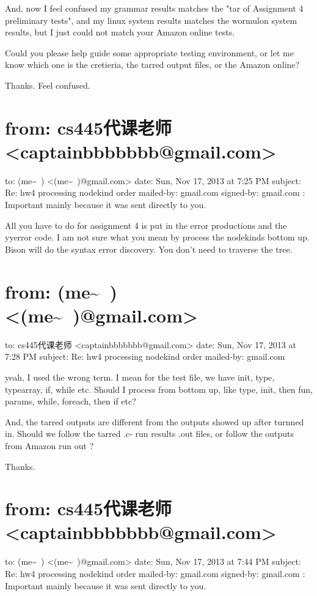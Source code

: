 \documentclass[12pt]{book}
\begin{document}
And, now I feel confused my grammar results matches the "tar of Assignment 4 preliminary tests", and my linux system results matches the wormulon system results, but I just could not match your Amazon online tests. 

Could you please help guide some appropriate testing environment, or let me know which one is the cretieria, the tarred output files, or the Amazon online?

Thanks. Feel confused. 


\section{from:         cs445代课老师 <captainbbbbbbb@gmail.com>}
\label{sec-48-3}
to:         (me\textasciitilde{}~) <(me\textasciitilde{}~)@gmail.com>
date:         Sun, Nov 17, 2013 at 7:25 PM
subject:         Re: hw4 processing nodekind order
mailed-by:         gmail.com
signed-by:         gmail.com
:         Important mainly because it was sent directly to you.

All you have to do for assignment 4 is put in the error productions and the yyerror code.
I am not sure what you mean by process the nodekinds bottom up.   Bison will do the
syntax error discovery.   You don't need to traverse the tree.


\section{from:         (me\textasciitilde{}~) <(me\textasciitilde{}~)@gmail.com>}
\label{sec-48-4}
to:         cs445代课老师 <captainbbbbbbb@gmail.com>
date:         Sun, Nov 17, 2013 at 7:28 PM
subject:         Re: hw4 processing nodekind order
mailed-by:         gmail.com

yeah, I used the wrong term. I mean for the test file, we have init, type, typearray, if, while etc. Should I process from bottom up, like type, init, then fun, params, while, foreach, then if etc? 

And, the tarred outputs are different from the outputs showed up after turnned in. Should we follow the tarred .c- run results .out files, or follow the outputs from Amazon run out ?

Thanks. 


\section{from:         cs445代课老师 <captainbbbbbbb@gmail.com>}
\label{sec-48-5}
to:         (me\textasciitilde{}~) <(me\textasciitilde{}~)@gmail.com>
date:         Sun, Nov 17, 2013 at 7:44 PM
subject:         Re: hw4 processing nodekind order
mailed-by:         gmail.com
signed-by:         gmail.com
:         Important mainly because it was sent directly to you.
\end{document}
